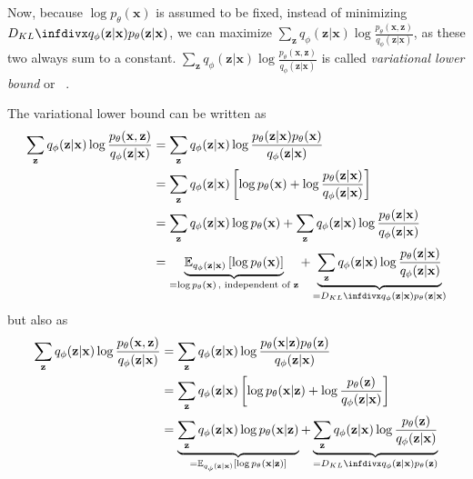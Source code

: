 Now, because $\log p_\theta(\mathbf{x})$ is assumed to be fixed, instead of minimizing $\kldiv{q_\phi(\mathbf{z}|\mathbf{x})}{p_\theta(\mathbf{z}|\mathbf{x})}$, we can maximize $\sum_\mathbf{z} q_\phi(\mathbf{z}|\mathbf{x}) \log \frac{p_\theta(\mathbf{x},\mathbf{z})}{q_\phi(\mathbf{z}|\mathbf{x})}$, as these two always sum to a constant.
$\sum_\mathbf{z} q_\phi(\mathbf{z}|\mathbf{x}) \log \frac{p_\theta(\mathbf{x},\mathbf{z})}{q_\phi(\mathbf{z}|\mathbf{x})}$ is called \textit{variational lower bound} or ~\citep[p. 18]{kingma2019introduction}.

The variational lower bound can be written as
\begin{align}
    \sum_\mathbf{z} q_\phi(\mathbf{z}|\mathbf{x}) \log \frac{p_\theta(\mathbf{x},\mathbf{z})}{q_\phi(\mathbf{z}|\mathbf{x})} &= \sum_\mathbf{z} q_\phi(\mathbf{z}|\mathbf{x}) \log \frac{p_\theta(\mathbf{z}|\mathbf{x})p_\theta(\mathbf{x})}{q_\phi(\mathbf{z}|\mathbf{x})}\\
    &= \sum_\mathbf{z} q_\phi(\mathbf{z}|\mathbf{x}) \left[ \log p_\theta(\mathbf{x}) + \log \frac{p_\theta(\mathbf{z}|\mathbf{x})}{q_\phi(\mathbf{z}|\mathbf{x})} \right]\\
    &= \sum_\mathbf{z} q_\phi(\mathbf{z}|\mathbf{x})\log p_\theta(\mathbf{x}) + \sum_\mathbf{z} q_\phi(\mathbf{z}|\mathbf{x})\log \frac{p_\theta(\mathbf{z}|\mathbf{x})}{q_\phi(\mathbf{z}|\mathbf{x})}\\
    &= \underbrace{\mathbb{E}_{q_\phi(\mathbf{z}|\mathbf{x})} \left[ \log p_\theta(\mathbf{x}) \right]}_{=\log p_\theta(\mathbf{x})\, \text{, independent of $\mathbf{z}$}} + \underbrace{\sum_\mathbf{z} q_\phi(\mathbf{z}|\mathbf{x})\log \frac{p_\theta(\mathbf{z}|\mathbf{x})}{q_\phi(\mathbf{z}|\mathbf{x})}}_{=\kldiv{q_\phi(\mathbf{z}|\mathbf{x})}{p_\theta(\mathbf{z}|\mathbf{x})}} \label{eq:elbo_lower_bound}
\end{align}
but also as
\begin{align}
    \sum_\mathbf{z} q_\phi(\mathbf{z}|\mathbf{x}) \log \frac{p_\theta(\mathbf{x},\mathbf{z})}{q_\phi(\mathbf{z}|\mathbf{x})} &= \sum_\mathbf{z} q_\phi(\mathbf{z}|\mathbf{x}) \log \frac{p_\theta(\mathbf{x}|\mathbf{z})p_\theta(\mathbf{z})}{q_\phi(\mathbf{z}|\mathbf{x})}\\
    &= \sum_\mathbf{z} q_\phi(\mathbf{z}|\mathbf{x}) \left[ \log p_\theta(\mathbf{x}|\mathbf{z}) + \log \frac{p_\theta(\mathbf{z})}{q_\phi(\mathbf{z}|\mathbf{x})} \right]\\
    &= \underbrace{\sum_\mathbf{z} q_\phi(\mathbf{z}|\mathbf{x})\log p_\theta(\mathbf{x}|\mathbf{z})}_{=\mathbb{E}_{q_\phi(\mathbf{z}|\mathbf{x})}\left[ \log p_\theta(\mathbf{x}|\mathbf{z}) \right]} + \underbrace{\sum_\mathbf{z} q_\phi(\mathbf{z}|\mathbf{x})\log \frac{p_\theta(\mathbf{z})}{q_\phi(\mathbf{z}|\mathbf{x})}}_{=\kldiv{q_\phi(\mathbf{z}|\mathbf{x})}{p_\theta(\mathbf{z})}} \label{eq:elbo_error_term}
\end{align}

